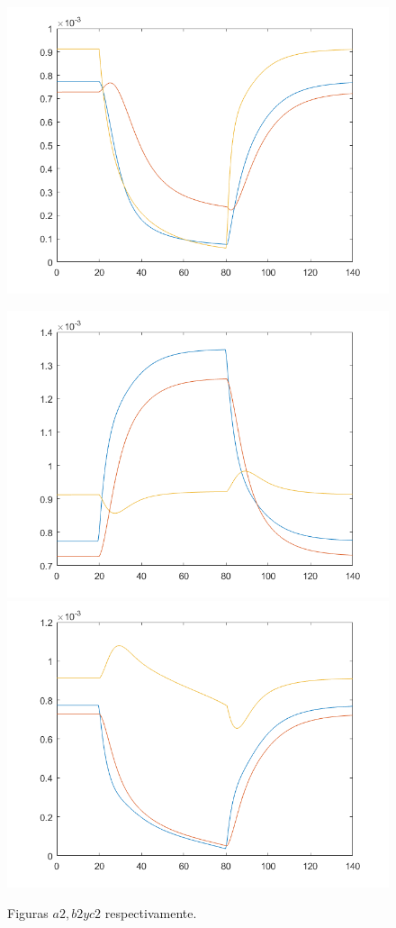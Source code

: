 \begin{figure}[h!]
\includegraphics[scale=0.3]{../c2.png}\\
\caption{Figuras $a2, b2 y c2$ respectivamente.}
\includegraphics[scale=0.3]{../a3.png}\hspace{0.01cm}
\includegraphics[scale=0.3]{../b3.png}\hspace{0.01cm}

\end{figure}
